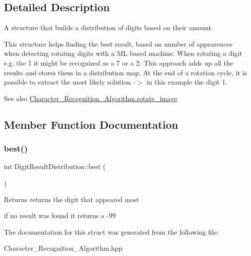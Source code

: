 \subsection{Detailed Description}
A structure that builds a distribution of digits based on their amount. 

This structure helps finding the best result, based on number of appearences when detecting rotating digits with a ML based machine. When rotating a digit e.\+g. the 1 it might be recognized as a 7 or a 2. This approach adds up all the results and stores them in a distribution map. At the end of a rotation cycle, it is possible to extract the most likely solution -\/$>$ in this example the digit 1.

\begin{DoxySeeAlso}{See also}
\mbox{\hyperlink{class_character___recognition___algorithm_a4f7714bd67ad5804c909859b8eb5b8c6}{Character\+\_\+\+Recognition\+\_\+\+Algorithm.\+rotate\+\_\+image}} 
\end{DoxySeeAlso}


\subsection{Member Function Documentation}
\mbox{\label{struct_digit_result_distribution_a51eaca67148d243afb838b8d93aa6362}} 
\subsubsection{\texorpdfstring{best()}{best()}}
{\footnotesize\ttfamily int Digit\+Result\+Distribution\+::best (\begin{DoxyParamCaption}{ }\end{DoxyParamCaption})\hspace{0.3cm}{\ttfamily [inline]}}

\begin{DoxyReturn}{Returns}
returns the digit that appeared most 

if no result was found it returns a -\/99 
\end{DoxyReturn}


The documentation for this struct was generated from the following file\+:\begin{DoxyCompactItemize}
\item 
Character\+\_\+\+Recognition\+\_\+\+Algorithm.\+hpp\end{DoxyCompactItemize}
